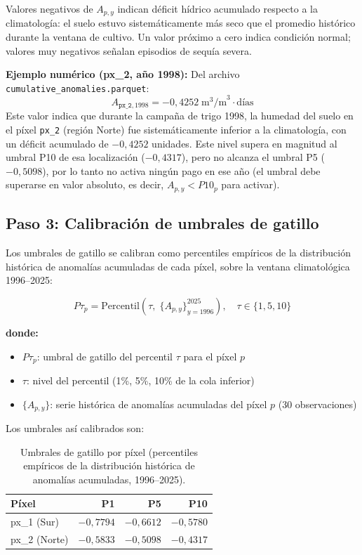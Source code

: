 \documentclass[11pt,a4paper]{article}
\begin{document}
Valores negativos de $A_{p,y}$ indican déficit hídrico acumulado respecto a la climatología: el suelo estuvo sistemáticamente más seco que el promedio histórico durante la ventana de cultivo. Un valor próximo a cero indica condición normal; valores muy negativos señalan episodios de sequía severa.

\textbf{Ejemplo numérico (px\_2, año 1998):}
Del archivo \texttt{cumulative\_anomalies.parquet}:
\[
  A_{\texttt{px\_2}, 1998} = -0{,}4252\;\text{m}^3\text{/m}^3 \cdot \text{días}
\]
Este valor indica que durante la campaña de trigo 1998, la humedad del suelo en el píxel \texttt{px\_2} (región Norte) fue sistemáticamente inferior a la climatología, con un déficit acumulado de $-0{,}4252$ unidades. Este nivel supera en magnitud al umbral P10 de esa localización ($-0{,}4317$), pero no alcanza el umbral P5 ($-0{,}5098$), por lo tanto no activa ningún pago en ese año (el umbral debe superarse en valor absoluto, es decir, $A_{p,y} < P10_{p}$ para activar).

\subsection{Paso 3: Calibración de umbrales de gatillo}
\label{sec:gatillos}

Los umbrales de gatillo se calibran como percentiles empíricos de la distribución histórica de anomalías acumuladas de cada píxel, sobre la ventana climatológica 1996--2025:

\begin{equation}
  P\tau_{p} = \text{Percentil}\!\left(\tau,\; \{A_{p,y}\}_{y=1996}^{2025}\right), \quad \tau \in \{1, 5, 10\}
\end{equation}

\textbf{donde:}
\begin{itemize}
  \item $P\tau_{p}$: umbral de gatillo del percentil $\tau$ para el píxel $p$
  \item $\tau$: nivel del percentil (1\%, 5\%, 10\% de la cola inferior)
  \item $\{A_{p,y}\}$: serie histórica de anomalías acumuladas del píxel $p$ (30 observaciones)
\end{itemize}

Los umbrales así calibrados son:

\renewcommand{\arraystretch}{1.3}
\begin{table}[ht]
  \centering
  \caption{Umbrales de gatillo por píxel (percentiles empíricos de la distribución histórica de anomalías acumuladas, 1996--2025).}
  \label{tab:umbrales}
  \begin{tabular}{lrrr}
    \toprule
    \textbf{Píxel} & \textbf{P1} & \textbf{P5} & \textbf{P10} \\
    \midrule
    px\_1 (Sur)  & $-0{,}7794$ & $-0{,}6612$ & $-0{,}5780$ \\
    px\_2 (Norte) & $-0{,}5833$ & $-0{,}5098$ & $-0{,}4317$ \\
    \bottomrule
  \end{tabular}
\end{table}
\end{document}
